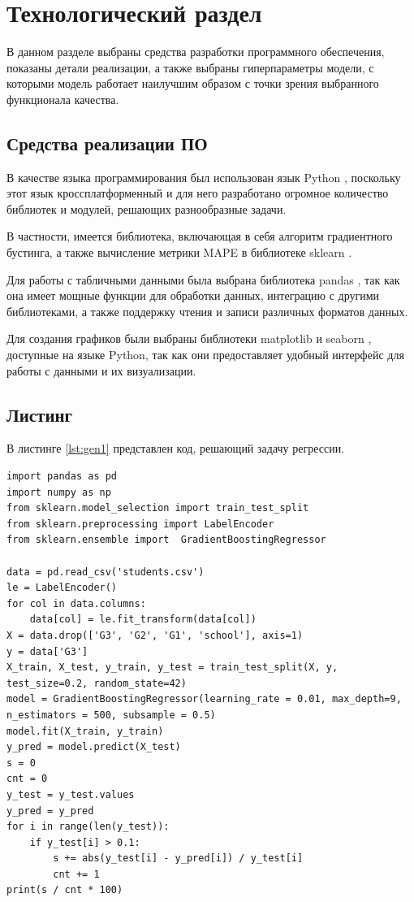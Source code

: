 \chapter{Технологический раздел}

В данном разделе выбраны средства разработки программного обеспечения, показаны детали реализации, а также выбраны гиперпараметры модели, с которыми модель работает наилучшим образом с точки зрения выбранного функционала качества.

\section{Средства реализации ПО}
В качестве языка программирования был использован язык Python \cite{bib:python}, поскольку этот язык кроссплатформенный и для него разработано огромное количество библиотек и модулей, решающих разнообразные задачи. 

В частности, имеется библиотека, включающая в себя алгоритм градиентного бустинга, а также вычисление метрики MAPE в библиотеке sklearn \cite{bib:sklearn}.

Для работы с табличными данными была выбрана библиотека pandas \cite{bib:pandas}, так как она имеет мощные функции для обработки данных, интеграцию с другими библиотеками, а также поддержку чтения и записи различных форматов данных.

Для создания графиков были выбраны библиотеки matplotlib \cite{bib:matplotlib} и seaborn \cite{bib:seaborn}, доступные на языке Python, так как они предоставляет удобный интерфейс для работы с данными и их визуализации.


\section{Листинг}
В листинге \ref{lst:gen1} представлен код, решающий задачу регрессии.

\begin{lstlisting}[label=lst:gen1,caption=Код для решения задачи регрессии]
import pandas as pd
import numpy as np
from sklearn.model_selection import train_test_split
from sklearn.preprocessing import LabelEncoder
from sklearn.ensemble import  GradientBoostingRegressor

data = pd.read_csv('students.csv')
le = LabelEncoder()
for col in data.columns:
    data[col] = le.fit_transform(data[col])
X = data.drop(['G3', 'G2', 'G1', 'school'], axis=1)
y = data['G3']
X_train, X_test, y_train, y_test = train_test_split(X, y, test_size=0.2, random_state=42)
model = GradientBoostingRegressor(learning_rate = 0.01, max_depth=9, n_estimators = 500, subsample = 0.5)
model.fit(X_train, y_train)
y_pred = model.predict(X_test)
s = 0
cnt = 0
y_test = y_test.values
y_pred = y_pred
for i in range(len(y_test)):
    if y_test[i] > 0.1:
        s += abs(y_test[i] - y_pred[i]) / y_test[i]
        cnt += 1
print(s / cnt * 100)

\end{lstlisting}

